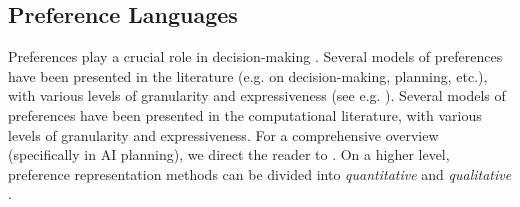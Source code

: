




\subsection{Preference Languages}
Preferences play a crucial role in decision-making \cite{Pigozzi2016}. Several models of preferences have been presented in the literature (e.g. on decision-making, planning, etc.), with various levels of granularity and expressiveness (see e.g. \cite{Domshlak2011}). Several models of preferences have been presented in the computational literature, with various levels of granularity and expressiveness. For a comprehensive overview (specifically in AI planning), we direct the reader to \cite{Baier2008,Brafman2009}. On a higher level, preference representation methods can be divided into \textit{quantitative} and \textit{qualitative} \cite{Baier2008}.

